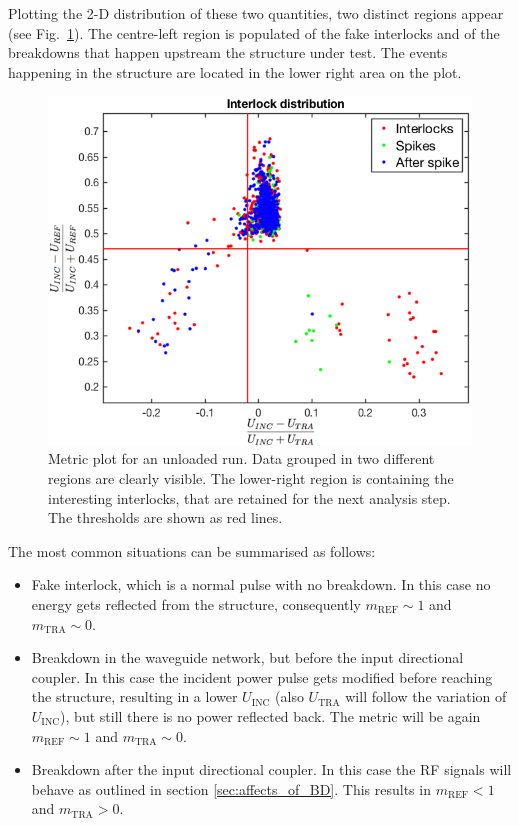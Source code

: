 Plotting the 2-D distribution of these two quantities, two distinct regions appear (see Fig.~\ref{Metric_plot}). The centre-left region is populated of the fake interlocks and of the breakdowns that happen upstream the structure under test. The events happening in the structure are located in the lower right area on the plot. 

\begin{figure}[h]
\centering 
\includegraphics[scale=0.46]{pictures/metric_plt.png}
\caption{Metric plot for an unloaded run. Data grouped in two different regions are clearly visible. The lower-right region is containing the interesting interlocks, that are retained for the next analysis step. The thresholds are shown as red lines.}
\label{Metric_plot}
\end{figure}


The most common situations can be summarised as follows:
\begin{itemize}
\item Fake interlock, which is a normal pulse with no breakdown. In this case no energy gets reflected from the structure, consequently $m_\text{REF} \sim 1$ and  $m_\text{TRA} \sim 0$.
\item Breakdown in the waveguide network, but before the input directional coupler. In this case the incident power pulse gets modified before reaching the structure, resulting in a lower $U_\text{INC}$ (also $U_\text{TRA}$ will follow the variation of $U_\text{INC}$), but still there is no power reflected back. The metric will be again $m_\text{REF} \sim 1$ and  $m_\text{TRA} \sim 0$.
\item Breakdown after the input directional coupler. In this case the RF signals will behave as outlined in section \ref{sec:affects_of_BD}. This results in $m_\text{REF} <1$ and  $m_\text{TRA} > 0$.
\end{itemize}


